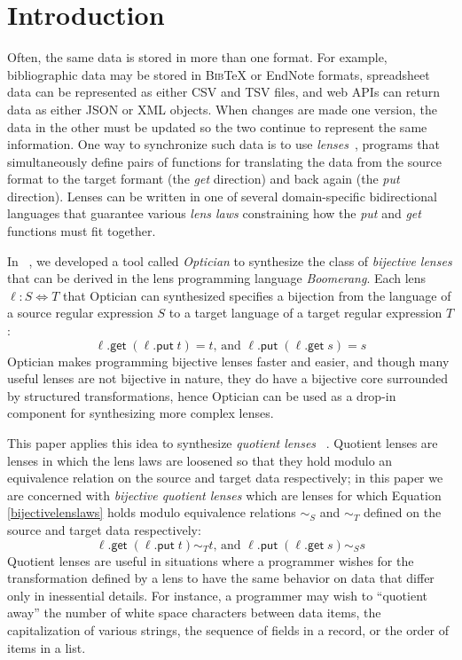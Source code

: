 \documentclass[acmsmall,review,anonymous]{acmart}
\newcommand{\codefont}[1]{\ensuremath{\mathsf{#1}}}
\newcommand{\kw}[1]{\codefont{#1}}
\newcommand{\bibtex}{\textsc{Bib}\TeX{}}
\newcommand{\get}{\ensuremath{\kw{get}}}
\newcommand{\lput}{\ensuremath{\kw{put}}}
\begin{document}
\section{Introduction}
Often, the same data is stored in more than one format. For example,
bibliographic data may be stored in \bibtex{} or EndNote formats,
spreadsheet data can be represented as either CSV and TSV files, and web
APIs can return data as either JSON or XML objects.  When changes are
made one version, the data in the other must be updated so the
two continue to represent the same information.
One way to synchronize such data is to use \emph{lenses}~\cite{Lenses}, 
programs that simultaneously define pairs of functions for translating
the data from the source format to the target formant (the \emph{get}
direction) and back again (the \emph{put} direction). Lenses can be
written in one of several domain-specific bidirectional languages that 
guarantee various \emph{lens laws} constraining how the \emph{put} and
\emph{get} functions must fit together. 

In ~\cite{optician}, we developed a tool called {\em Optician} to synthesize the
class of {\em bijective lenses} that can be derived in the lens programming
language {\em Boomerang}\cite{boomerang}. Each lens $\ell : S \Leftrightarrow T$
that Optician can synthesized specifies a bijection from the language of a
source regular expression $S$ to a target language of a target regular
expression $T$: \begin{equation}\label{bijectivelenslaws} \ell.\get \;
(\ell.\lput \; t) = t \text{, and } \ell.\lput \; (\ell.\get \; s) = s
\end{equation}
Optician makes programming bijective lenses faster and easier, and though
many useful lenses are not bijective in nature, they do have a bijective core
surrounded by structured transformations, hence Optician can be used as a
drop-in component for synthesizing more complex lenses.

This paper applies this idea to synthesize {\em quotient lenses}
~\cite{quotientlenses}. Quotient lenses are lenses in which the lens laws are
loosened so that they hold modulo an equivalence relation on the source and
target data respectively; in this paper we are concerned with {\em bijective
quotient lenses} which are lenses for which Equation \ref{bijectivelenslaws}
holds modulo equivalence relations $\sim_S$ and $\sim_T$ defined on the source
and target data respectively:
\begin{equation}\label{quotientlenslaws}
\ell.\get \; (\ell.\lput \; t) \sim_T t \text{, and } \ell.\lput \; (\ell.\get
\; s) \sim_S s
\end{equation}
Quotient lenses are useful in situations where a programmer wishes for the
transformation defined by a lens to have the same behavior on data that differ
only in inessential details. For instance, a programmer may wish to ``quotient
away'' the number of white space characters between data items, the
capitalization of various strings, the sequence of fields in a record, or the
order of items in a list.
\end{document}
